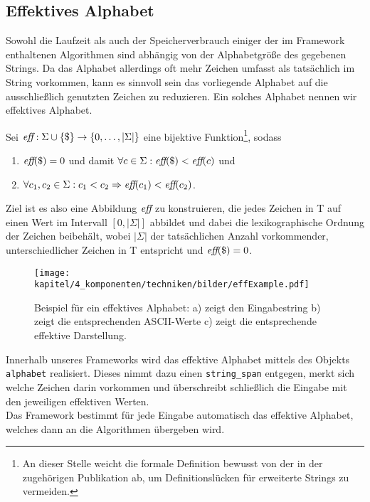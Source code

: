 \subsection{Effektives Alphabet}
\label{section:effalphabet}
Sowohl  die Laufzeit als auch der Speicherverbrauch einiger der im Framework enthaltenen Algorithmen sind abhängig von der Alphabetgröße des gegebenen Strings. Da das Alphabet allerdings oft mehr Zeichen umfasst als tatsächlich im String vorkommen, kann es sinnvoll sein das vorliegende Alphabet auf die ausschließlich genutzten Zeichen zu reduzieren. Ein solches Alphabet nennen wir effektives Alphabet.\par
\begin{definition}
	\label{def:effective_alphabet}
	Sei \(\textit{eff} : \Sigma \cup \{\$\} \rightarrow \{0, \ldots, |\Sigma|\}\) eine bijektive Funktion\footnote{\label{differs_from_paper}An dieser Stelle weicht die formale Definition bewusst von der in der zugehörigen Publikation \cite{saca:2} ab, um Definitionslücken für erweiterte Strings zu vermeiden.}, sodass
	\begin{enumerate}
		\item \(\textit{eff}(\$) = 0\) \quad und damit \(\forall c \in \Sigma : \textit{eff}(\$) < \textit{eff}(c)\) und
		\item \(\forall c_1, c_2 \in \Sigma : c_1 < c_2 \Rightarrow \textit{eff}(c_1) < \textit{eff}(c_2)\).
	\end{enumerate}
\end{definition}
Ziel ist es also eine Abbildung $\textit{eff}$ zu konstruieren, die jedes Zeichen in T auf einen Wert im Intervall $[0,|\Sigma|]$ abbildet und dabei die lexikographische Ordnung der Zeichen beibehält, wobei $|\Sigma|$ der tatsächlichen Anzahl vorkommender, unterschiedlicher Zeichen in T entspricht und $\textit{eff}(\$)=0$.\\

\begin{figure}[ht]
\centering
\texttt{[image: kapitel/4\_komponenten/techniken/bilder/effExample.pdf]}
\caption{Beispiel für ein effektives Alphabet: a) zeigt den Eingabestring b) zeigt die entsprechenden ASCII-Werte c) zeigt die entsprechende effektive Darstellung.}
\end{figure}
Innerhalb unseres Frameworks wird das effektive Alphabet mittels des Objekts \texttt{alphabet} realisiert. Dieses nimmt dazu einen \texttt{string_span} entgegen, merkt sich welche Zeichen darin vorkommen und überschreibt schließlich die Eingabe mit den jeweiligen effektiven Werten. \\
Das Framework bestimmt für jede Eingabe automatisch das effektive Alphabet, welches dann an die Algorithmen übergeben wird. 
